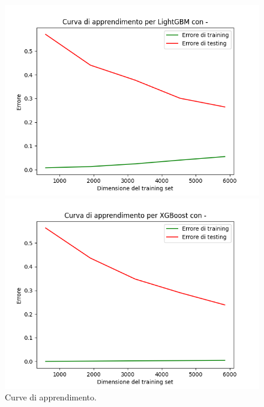\begin{figure}[H]
    \begin{minipage}[b]{0.45\linewidth}
      \centering
      \includegraphics[scale=0.5]{img/learning_curve_LightGBM_-.png}
      
    \end{minipage}
    \hfill
    \begin{minipage}[b]{0.45\linewidth}
      \centering
      \includegraphics[scale=0.5]{img/learning_curve_XGBoost_-.png}
      
    \end{minipage}
    \caption{Curve di apprendimento.}
    
    \end{figure}

